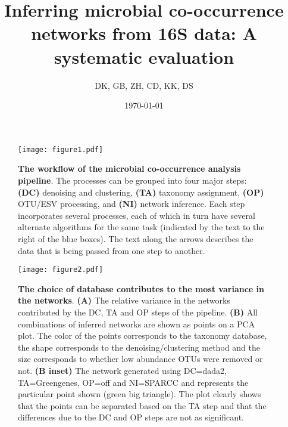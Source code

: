




\title{ \huge Inferring microbial co-occurrence networks from 16S data: A systematic evaluation }
\author{DK, GB, ZH, CD, KK, DS}
\date{\today}



\maketitle

\begin{figure}[h]
  \centering
  \texttt{[image: figure1.pdf]}
  \caption{
    \textbf{The workflow of the microbial co-occurrence analysis pipeline}.
    The processes can be grouped into four major steps: \textbf{(DC)} denoising and clustering, \textbf{(TA)} taxonomy assignment, \textbf{(OP)} OTU/ESV processing, and \textbf{(NI)} network inference.
    Each step incorporates several processes, each of which in turn have several alternate algorithms for the same task (indicated by the text to the right of the blue boxes).
    The text along the arrows describes the data that is being passed from one step to another.
  }
  \label{fig:figure1}
\end{figure}

\begin{figure}[h]
  \centering
  \texttt{[image: figure2.pdf]}
  \caption{
    \textbf{The choice of database contributes to the most variance in the networks}.
    \textbf{(A)} The relative variance in the networks contributed by the DC, TA and OP steps of the pipeline.
    \textbf{(B)} All combinations of inferred networks are shown as points on a PCA plot.
    The color of the points corresponds to the taxonomy database, the shape corresponds to the denoising/clustering method and the size corresponds to whether low abundance OTUs were removed or not.
    \textbf{(B inset)} The network generated using DC=dada2, TA=Greengenes, OP=off and NI=SPARCC and represents the particular point shown (green big triangle).
    The plot clearly shows that the points can be separated based on the TA step and that the differences due to the DC and OP steps are not as significant.
  }
  \label{fig:figure2}
\end{figure}

